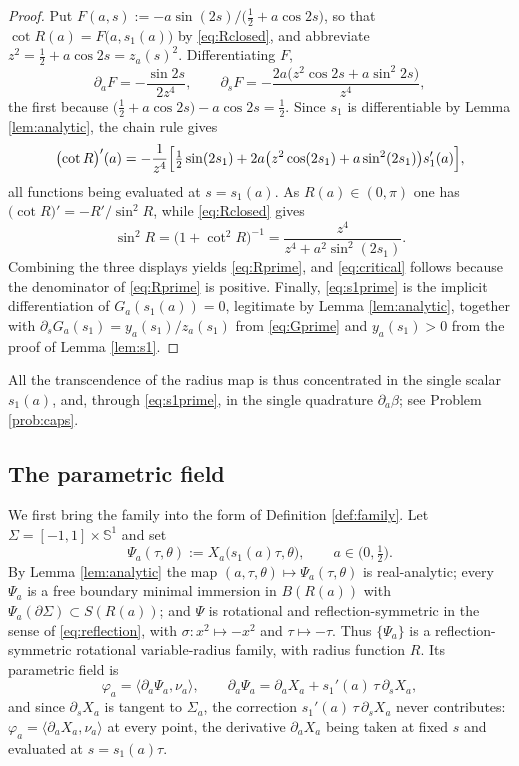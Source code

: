 \documentclass[11pt,a4paper]{amsart}
\theoremstyle{plain}
\theoremstyle{definition}
\newcommand{\Sph}{\mathbb{S}}
\begin{document}
\begin{proof}
Put $F(a,s):=-a\sin(2s)\bigl/\bigl(\tfrac12+a\cos 2s\bigr)$, so that $\cot R(a)=F\bigl(a,s_1(a)\bigr)$ by \eqref{eq:Rclosed}, and abbreviate $z^2=\tfrac12+a\cos 2s=z_a(s)^2$. Differentiating $F$,
\[
\partial_aF=-\frac{\sin 2s}{2z^4},\qquad
\partial_sF=-\frac{2a\bigl(z^2\cos 2s+a\sin^2 2s\bigr)}{z^4},
\]
the first because $\bigl(\tfrac12+a\cos2s\bigr)-a\cos 2s=\tfrac12$. Since $s_1$ is differentiable by Lemma \ref{lem:analytic}, the chain rule gives
\[
\bigl(\cot R\bigr)'(a)=-\frac{1}{z^4}\Bigl[\tfrac12\sin(2s_1)+2a\bigl(z^2\cos(2s_1)+a\sin^2(2s_1)\bigr)s_1'(a)\Bigr],
\]
all functions being evaluated at $s=s_1(a)$. As $R(a)\in(0,\pi)$ one has $\bigl(\cot R\bigr)'=-R'/\sin^2R$, while \eqref{eq:Rclosed} gives
\[
\sin^2R=\bigl(1+\cot^2R\bigr)^{-1}=\frac{z^4}{z^4+a^2\sin^2(2s_1)} .
\]
Combining the three displays yields \eqref{eq:Rprime}, and \eqref{eq:critical} follows because the denominator of \eqref{eq:Rprime} is positive. Finally, \eqref{eq:s1prime} is the implicit differentiation of $G_a(s_1(a))=0$, legitimate by Lemma \ref{lem:analytic}, together with $\partial_sG_a(s_1)=y_a(s_1)/z_a(s_1)$ from \eqref{eq:Gprime} and $y_a(s_1)>0$ from the proof of Lemma \ref{lem:s1}.
\end{proof}

All the transcendence of the radius map is thus concentrated in the single scalar $s_1(a)$, and, through \eqref{eq:s1prime}, in the single quadrature $\partial_a\beta$; see Problem \ref{prob:caps}.

\subsection*{The parametric field}

We first bring the family into the form of Definition \ref{def:family}. Let $\Sigma=[-1,1]\times\Sph^1$ and set
\begin{equation}\label{eq:Psi}
\Psi_a(\tau,\theta):=X_a\bigl(s_1(a)\tau,\theta\bigr),\qquad a\in\bigl(0,\tfrac12\bigr).
\end{equation}
By Lemma \ref{lem:analytic} the map $(a,\tau,\theta)\mapsto\Psi_a(\tau,\theta)$ is real-analytic; every $\Psi_a$ is a free boundary minimal immersion in $B(R(a))$ with $\Psi_a(\partial\Sigma)\subset S(R(a))$; and $\Psi$ is rotational and reflection-symmetric in the sense of \eqref{eq:reflection}, with $\sigma:x^2\mapsto-x^2$ and $\tau\mapsto-\tau$. Thus $\{\Psi_a\}$ is a reflection-symmetric rotational variable-radius family, with radius function $R$. Its parametric field is
\[
\varphi_a=\bigl\langle\partial_a\Psi_a,\nu_a\bigr\rangle,\qquad \partial_a\Psi_a=\partial_aX_a+s_1'(a)\,\tau\,\partial_sX_a ,
\]
and since $\partial_sX_a$ is tangent to $\Sigma_a$, the correction $s_1'(a)\,\tau\,\partial_sX_a$ never contributes: $\varphi_a=\langle\partial_aX_a,\nu_a\rangle$ at every point, the derivative $\partial_aX_a$ being taken at fixed $s$ and evaluated at $s=s_1(a)\tau$.
\end{document}

